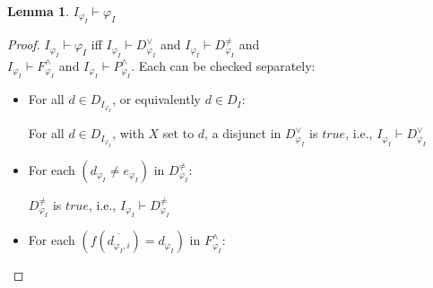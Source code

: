 \documentclass[letterpaper]{article}
\newenvironment{packed_itemize}{
\vspace*{-0.2em}
\begin{itemize}
\setlength{\partopsep}{0pt}
\setlength{\itemsep}{1pt}
\setlength{\parskip}{0pt}
\setlength{\parsep}{0pt}
}{\end{itemize}}
\newtheorem*{lemma}{Lemma}
\newcommand{\true}{{\mathit{true}}}
\begin{document}
\begin{lemma} 
$I_{\varphi_I} \vdash \varphi_I$
\end{lemma}
\begin{proof}
$I_{\varphi_I} \vdash \varphi_I$ iff 
$I_{\varphi_I} \vdash D^\vee_{\varphi_I}$ and
$I_{\varphi_I} \vdash D^{\neq}_{\varphi_I}$ and \\
$I_{\varphi_I} \vdash F^\wedge_{\varphi_I}$ and
$I_{\varphi_I} \vdash P^\wedge_{\varphi_I}$. 
Each can be checked separately:
\begin{itemize}
\item For all $d \in D_{I_{\varphi_I}}$, or equivalently $d \in D_I$:
      For all $d \in D_{I_{\varphi_I}}$, with $X$ set to $d$, a disjunct in $D^\vee_{\varphi_I}$ 
      is $\true$, i.e., $I_{\varphi_I} \vdash D^\vee_{\varphi_I}$
\item For each $(d_{\varphi_I} \neq e_{\varphi_I})$ in $D^{\neq}_{\varphi_I}$:
      $D^{\neq}_{\varphi_I}$ is $\true$, i.e.,
      $I_{\varphi_I} \vdash D^{\neq}_{\varphi_I}$
\item For each $(f(\overline{d_{\varphi_I,i}}) = d_{\varphi_I})$ in $F^\wedge_{\varphi_I}$:

\end{itemize}
\end{proof}
\end{document}
